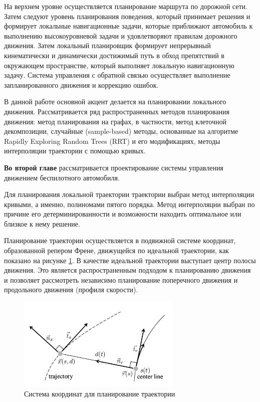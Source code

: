 На верхнем уровне осуществляется планирование маршрута по дорожной сети. Затем следуют уровень планирования
поведения, который принимает решения и формирует локальные навигационные задачи, которые приближают автомобиль
к выполнению высокоуровневой задачи и удовлетворяют правилам дорожного движения. Затем локальный планировщик
формирует непрерывный кинематически и динамически достижимый путь в обход препятствий в окружающем пространстве, который выполняет локальную навигационную задачу. Система
управления с обратной связью осуществляет выполнение запланированного движения и коррекцию ошибок.

В данной работе основной акцент делается на планировании локального движения. Рассматривается ряд распространенных
методов планирования движения: метод планирования на графах, в частности, метод клеточной декомпозиции, случайные
(sample-based) методы, основанные на алгоритме Rapidly Exploring Random Trees (RRT) и его модификациях, методы
интерполяции траектории с помощью кривых.

\textbf{Во второй главе} рассматривается проектирование системы управления движением беспилотного автомобиля.

Для планирования локальной траектории траектории выбран метод интерполяции кривыми, а именно, полиномами
пятого порядка. Метод интерполяции выбран по причине его детерминированности и возможности находить оптимальное
или близкое к нему решение.

Планирование траектории осуществляется в подвижной системе координат, образованной репером Френе,
движущейся по идеальной траектории, как показано на рисунке \ref{img:junior_frenet_frame}. В качестве
идеальной траектории  выступает центр полосы движения. Это является распространенным подходом к
планированию движения и позволяет рассмотреть независимо планирование поперечного движения и
продольного движения (профиля скорости).

\begin{figure}[h]
    \centering
    \includegraphics[width=0.7\textwidth]{images/junior_frenet_frame}
    \caption{Система координат для планирование траектории}
    \label{img:junior_frenet_frame}
\end{figure}

